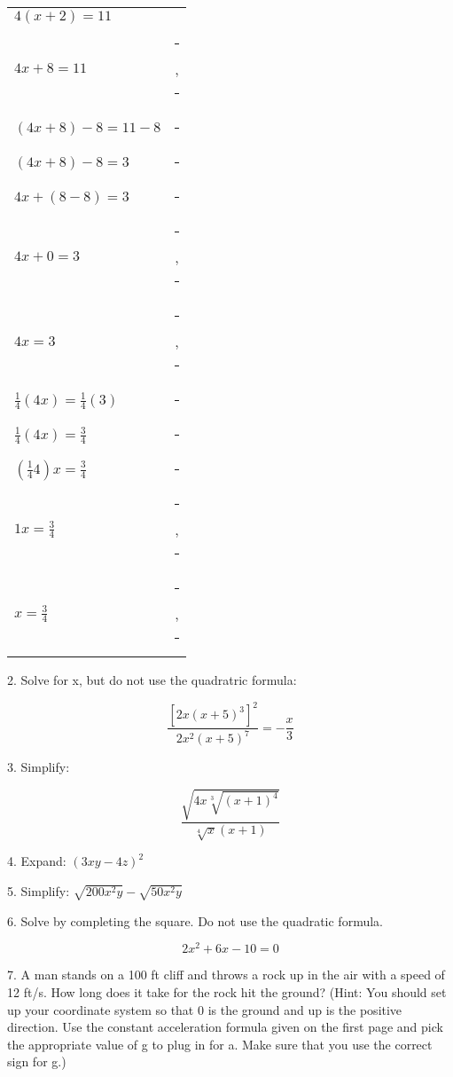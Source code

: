 \documentclass[letterpaper, 12pt]{article}
\newcommand{\fillin}{\rule{1in}{1pt}}
\begin{document}
\bigskip

\begin{tabular}{ll}
$4(x+2)=11$ & \\
$4x+8=11$ & \fillin, \fillin \\
$(4x+8)-8=11-8$ & \fillin \\
$(4x+8)-8=3$ & \fillin \\
$4x+(8-8)=3$ & \fillin \\
$4x+0=3$ & \fillin, \fillin \\
$4x=3$ & \fillin, \fillin \\
$\frac{1}{4}(4x)=\frac{1}{4}(3)$ & \fillin \\
$\frac{1}{4}(4x)=\frac{3}{4}$ & \fillin \\
$(\frac{1}{4}4)x=\frac{3}{4}$ & \fillin \\
$1x=\frac{3}{4}$ & \fillin, \fillin \\
$x=\frac{3}{4}$ & \fillin, \fillin \\
\end{tabular}

\vspace{1in}

2. Solve for x, but do not use the quadratric formula:

\[\frac{\left[2x(x+5)^3\right]^2}{2x^2(x+5)^7}=-\frac{x}{3}\]

\newpage

3. Simplify:

\[\frac{\sqrt{4x\sqrt[3]{(x+1)^4}}}{\sqrt[4]{x}(x+1)}\]

\vspace{4in}

4. Expand: $(3xy-4z)^2$

\newpage

5. Simplify: $\sqrt{200x^2y}-\sqrt{50x^2y}$

\vspace{3in}

6. Solve by completing the square. Do not use the quadratic formula.

\[2x^2+6x-10=0\]

\newpage

7. A man stands on a 100 ft cliff and throws a rock up in the air with a speed
of 12 ft/s. How long does it take for the rock hit the ground? (Hint: You
should set up your coordinate system so that 0 is the ground and up is the
positive direction. Use the constant acceleration formula given on the first
page and pick the appropriate value of g to plug in for a. Make sure that you
use the correct sign for g.)
\end{document}

